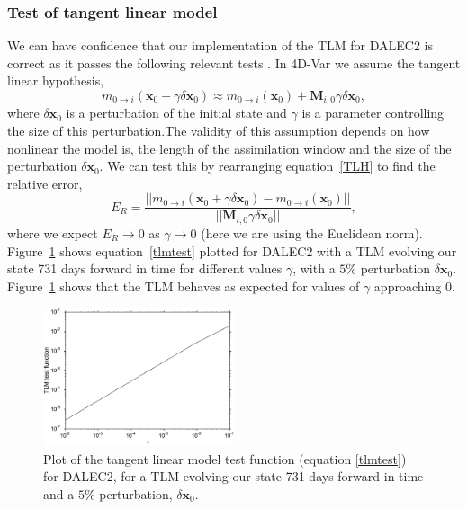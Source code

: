 \documentclass[11pt]{article}
\begin{document}
\subsubsection{Test of tangent linear model} \label{sec:testtlm}

We can have confidence that our implementation of the TLM for DALEC2 is correct as it passes the following relevant tests \citep{Li1994}. In 4D-Var we assume the tangent linear hypothesis,
\begin{equation}
m_{0\rightarrow i}(\mathbf{x}_0+\gamma \delta\mathbf{x}_0) \approx m_{0 \rightarrow i}(\mathbf{x}_0) + \mathbf{M}_{i,0}\gamma \delta\mathbf{x}_0, \label{TLH}
\end{equation}
where $\delta\mathbf{x}_0$ is a perturbation of the initial state and $\gamma$ is a parameter controlling the size of this perturbation.The validity of this assumption depends on how nonlinear the model is, the length of the assimilation window and the size of the perturbation $\delta\mathbf{x}_0$. We can test this by rearranging equation~\ref{TLH} to find the relative error,
\begin{equation}
E_R=\frac{||m_{0\rightarrow i}(\mathbf{x}_0+\gamma \delta\mathbf{x}_0) - m_{0 \rightarrow i}(\mathbf{x}_0)||}{||\mathbf{M}_{i,0}\gamma\delta\mathbf{x}_0||}, \label{tlmtest}
\end{equation}
where we expect $E_R \rightarrow 0$ as $\gamma \rightarrow 0$ (here we are using the Euclidean norm). Figure~\ref{fig:tlm} shows equation~\ref{tlmtest} plotted for DALEC2 with a TLM evolving our state 731 days forward in time for different values $\gamma$, with a $5\%$ perturbation $\delta\mathbf{x}_0$. Figure~\ref{fig:tlm} shows that the TLM behaves as expected for values of $\gamma$ approaching $0$.


\begin{figure}[ht]
    \centering
    \includegraphics[width=0.5\textwidth]{linmoderr.eps}
    \caption{Plot of the tangent linear model test function (equation \ref{tlmtest}) for DALEC2, for a TLM evolving our state 731 days forward in time and a $5\%$ perturbation, $\delta \textbf{x}_0$.}
    \label{fig:tlm}
\end{figure}
\end{document}
